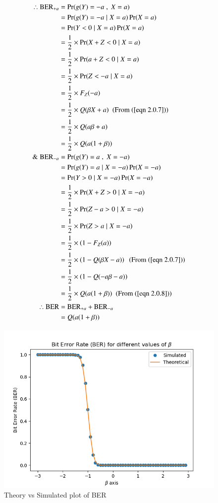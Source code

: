 \documentclass[journal,10pt,twocolumn]{IEEEtran}
\begin{document}
\begin{align}
\therefore \text{BER}_{+a} &= \Pr(g(Y) = -a \;,\; X = a)\\
&= \Pr(g(Y) = -a \;|\; X = a) \Pr(X=a)\\
&= \Pr(Y < 0 \;|\; X = a) \Pr(X=a)\\
&= \dfrac{1}{2} \times \Pr(X+Z < 0 \;|\; X = a) \\
&= \dfrac{1}{2} \times \Pr(a+Z < 0 \;|\; X = a) \\
&= \dfrac{1}{2} \times \Pr(Z < -a \;|\; X = a) \\
&= \dfrac{1}{2} \times F_Z(-a)\\
&= \dfrac{1}{2} \times Q(\beta X + a) \; \text{ (From (\ref{eqn 2.0.7}))}\\
&= \dfrac{1}{2} \times Q(a \beta + a)\\
&= \dfrac{1}{2} \times Q(a(1+\beta))\\
\& \; \text{BER}_{-a} &= \Pr(g(Y) = a \;,\; X = -a)\\
&= \Pr(g(Y) = a \;|\; X = -a) \Pr(X=-a)\\
&= \Pr(Y > 0 \;|\; X = -a) \Pr(X=-a)\\
&= \dfrac{1}{2} \times \Pr(X+Z > 0 \;|\; X = -a) \\
&= \dfrac{1}{2} \times \Pr(Z-a > 0 \;|\; X = -a) \\
&= \dfrac{1}{2} \times \Pr(Z > a \;|\; X = -a) \\
&= \dfrac{1}{2} \times \left( 1 - F_Z(a) \right) \\
&= \dfrac{1}{2} \times \left( 1 - Q(\beta X -a) \right) \; \text{ (From (\ref{eqn 2.0.7}))}\\
&= \dfrac{1}{2} \times \left( 1 - Q(-a \beta -a) \right) \\
&= \dfrac{1}{2} \times Q(a(1+\beta)) \; \text{ (From (\ref{eqn 2.0.8}))}\\
\therefore \text{BER} &= \text{BER}_{+a} + \text{BER}_{-a}\\
&= Q(a(1+\beta))
\end{align} 
\begin{figure}[!hbt]
    \centering
	\includegraphics[width=\columnwidth]{./Figures/Figure_1.png}
    \caption{Theory vs Simulated plot of BER}
    \label{CDF_Y}
\end{figure}
\end{document}
